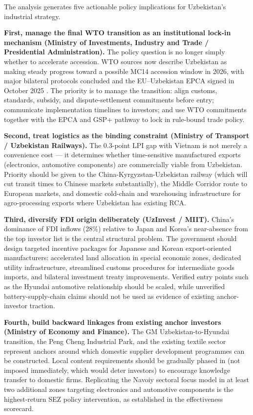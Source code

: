 \documentclass[14pt,a4paper]{extarticle}
\begin{document}
The analysis generates five actionable policy implications for Uzbekistan's industrial strategy.

\textbf{First, manage the final WTO transition as an institutional lock-in mechanism (Ministry of Investments, Industry and Trade / Presidential Administration).} The policy question is no longer simply whether to accelerate accession. WTO sources now describe Uzbekistan as making steady progress toward a possible MC14 accession window in 2026, with major bilateral protocols concluded and the EU--Uzbekistan EPCA signed in October 2025 \citep{wto2025uzbekistan, uzbekistan2025epca}. The priority is to manage the transition: align customs, standards, subsidy, and dispute-settlement commitments before entry; communicate implementation timelines to investors; and use WTO commitments together with the EPCA and GSP+ pathway to lock in rule-bound trade policy.

\textbf{Second, treat logistics as the binding constraint (Ministry of Transport / Uzbekistan Railways).} The 0.3-point LPI gap with Vietnam is not merely a convenience cost --- it determines whether time-sensitive manufactured exports (electronics, automotive components) are commercially viable from Uzbekistan. Priority should be given to the China-Kyrgyzstan-Uzbekistan railway (which will cut transit times to Chinese markets substantially), the Middle Corridor route to European markets, and domestic cold-chain and warehousing infrastructure for agro-processing exports where Uzbekistan has existing RCA.

\textbf{Third, diversify FDI origin deliberately (UzInvest / MIIT).} China's dominance of FDI inflows (28\%) relative to Japan and Korea's near-absence from the top investor list is the central structural problem. The government should design targeted incentive packages for Japanese and Korean export-oriented manufacturers: accelerated land allocation in special economic zones, dedicated utility infrastructure, streamlined customs procedures for intermediate goods imports, and bilateral investment treaty improvements. Verified entry points such as the Hyundai automotive relationship should be scaled, while unverified battery-supply-chain claims should not be used as evidence of existing anchor-investor traction.

\textbf{Fourth, build backward linkages from existing anchor investors (Ministry of Economy and Finance).} The GM Uzbekistan-to-Hyundai transition, the Peng Cheng Industrial Park, and the existing textile sector represent anchors around which domestic supplier development programmes can be constructed. Local content requirements should be gradually phased in (not imposed immediately, which would deter investors) to encourage knowledge transfer to domestic firms. Replicating the Navoiy sectoral focus model in at least two additional zones targeting electronics and automotive components is the highest-return SEZ policy intervention, as established in the effectiveness scorecard.
\end{document}
